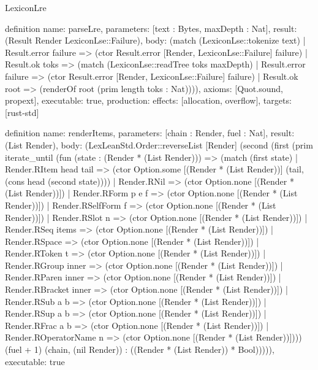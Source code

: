 \begin{lexlean}{LexiconLre}
\begin{semanticmodule}
definition{
  name: parseLre,
  parameters: [text : Bytes, maxDepth : Nat],
  result: (Result Render LexiconLse::Failure),
  body: (match (LexiconLse::tokenize text)
    | Result.error failure => (ctor Result.error [Render, LexiconLse::Failure] failure)
    | Result.ok toks => (match (LexiconLse::readTree toks maxDepth)
      | Result.error failure => (ctor Result.error [Render, LexiconLse::Failure] failure)
      | Result.ok root => (renderOf root (prim length toks : Nat)))),
  axioms: [Quot.sound, propext],
  executable: true,
  production: {effects: [allocation, overflow], targets: [rust-std]}
}

definition{
  name: renderItems,
  parameters: [chain : Render, fuel : Nat],
  result: (List Render),
  body: (LexLeanStd.Order::reverseList [Render] (second (first (prim iterate_until (fun (state : (Render * (List Render))) => (match (first state)
    | Render.RItem head tail => (ctor Option.some [(Render * (List Render))] (tail, (cons head (second state))))
    | Render.RNil => (ctor Option.none [(Render * (List Render))])
    | Render.RForm p e f => (ctor Option.none [(Render * (List Render))])
    | Render.RSelfForm f => (ctor Option.none [(Render * (List Render))])
    | Render.RSlot n => (ctor Option.none [(Render * (List Render))])
    | Render.RSeq items => (ctor Option.none [(Render * (List Render))])
    | Render.RSpace => (ctor Option.none [(Render * (List Render))])
    | Render.RToken t => (ctor Option.none [(Render * (List Render))])
    | Render.RGroup inner => (ctor Option.none [(Render * (List Render))])
    | Render.RParen inner => (ctor Option.none [(Render * (List Render))])
    | Render.RBracket inner => (ctor Option.none [(Render * (List Render))])
    | Render.RSub a b => (ctor Option.none [(Render * (List Render))])
    | Render.RSup a b => (ctor Option.none [(Render * (List Render))])
    | Render.RFrac a b => (ctor Option.none [(Render * (List Render))])
    | Render.ROperatorName n => (ctor Option.none [(Render * (List Render))]))) (fuel + 1) (chain, (nil Render)) : ((Render * (List Render)) * Bool))))),
  executable: true
}


\end{semanticmodule}
\end{lexlean}

